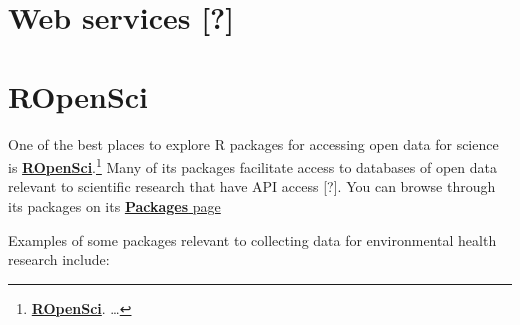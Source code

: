 \documentclass[]{tufte-book}
\begin{document}
\hypertarget{web-services}{%
\section{Web services {[}?{]}}\label{web-services}}

\hypertarget{ropensci}{%
\section{ROpenSci}\label{ropensci}}

One of the best places to explore R packages for accessing open data for science is
\href{https://ropensci.org/}{\textbf{ROpenSci}}.\footnote{\href{https://ropensci.org/}{\textbf{ROpenSci}}. \ldots{}}
Many of its packages facilitate access to databases of open data relevant to scientific
research that have API access {[}?{]}. You can browse through its packages on
its \href{https://ropensci.org/packages/}{\textbf{Packages} page}

Examples of some packages relevant to collecting data for environmental health research
include:
\end{document}
